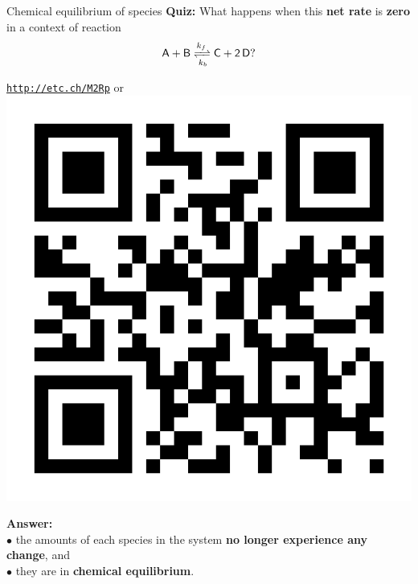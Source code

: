 \begin{frame}{Chemical equilibrium of species}
%
\alert{\textbf{Quiz:}} What happens when this \textbf{net rate} is \alert{\textbf{zero}} in a context of reaction 
%
\[
\mathsf{A+B \xrightleftharpoons[k_b]{k_f} C+2\,D?}
\]
%
\begin{center}{ \href{http://etc.ch/M2Rp}{\textcolor{indigo(dye)}{\tt http://etc.ch/M2Rp}}} \quad
or \quad
\includegraphics[height=0.23\columnwidth]{figures/intro/poll.png}
\end{center}
\hiddenpause
\textbf{Answer:} \\ 
\qquad $\bullet$ the amounts of each species in the system \textbf{no longer experience any change}, and \\ 
\qquad $\bullet$ they are in \alert{\textbf{chemical equilibrium}}.

\end{frame}
